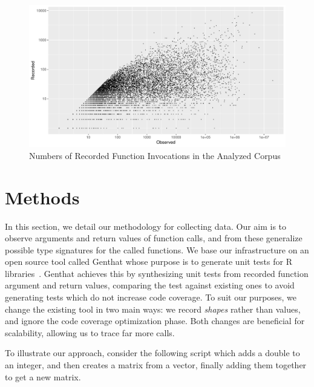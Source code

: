 \documentclass[acmsmall,10pt,review,anonymous]{acmart}\settopmatter{printfolios=true,printccs=false,printacmref=false}
\newcommand{\genthat}{{\sc Genthat}\xspace}
\begin{document}
\begin{figure}[htbp]\begin{center}
\includegraphics[width=.9\textwidth]{recordsbypkg}
\caption{Numbers of Recorded Function Invocations in the Analyzed Corpus}
\label{recorded}\end{center}
\end{figure}

\newpage
\section{Methods}

In this section, we detail our methodology for collecting data.  Our aim is
to observe arguments and return values of function calls, and from these
generalize possible type signatures for the called functions.  We base our
infrastructure on an open source tool called \genthat whose purpose is to
generate unit tests for R libraries~\cite{issta18}.  \genthat achieves this
by synthesizing unit tests from recorded function argument and return
values, comparing the test against existing ones to avoid generating tests
which do not increase code coverage.  To suit our purposes, we change the
existing tool in two main ways: we record \emph{shapes} rather than values,
and ignore the code coverage optimization phase.  Both changes are
beneficial for scalability, allowing us to trace far more calls.


To illustrate our approach, consider the following script which adds a
double to an integer, and then creates a matrix from a vector, finally
adding them together to get a new matrix.
\end{document}
